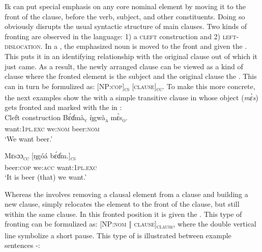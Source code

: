 Ik can put special emphasis on any core nominal element by moving it to the front of the clause, before the verb, subject, and other constituents. Doing so obviously disrupts the usual syntactic structure of main clauses. Two kinds of fronting are observed in the language: 1) a \textsc{cleft} construction and 2) \textsc{left-dislocation}. In a , the emphasized noun is moved to the front and given the . This puts it in an identifying relationship with the original clause out of which it just came. As a result, the newly arranged clause can be viewed as a kind of  clause where the fronted element is the  subject and the original clause the  . This can in turn be formulized as: [NP:\textsc{cop}]\textsc{\textsubscript{cs}}\textsc{ [clause]}\textsc{\textsubscript{cc}}. To make this more concrete, the next examples show the  with a simple transitive clause in  whose object (\textit{m\`{ɛ}s}) gets fronted and marked with the  in :\\ 




Cleft construction
\ea\label{ex:syn:31}
\gll B\'{ɛ}ɗ{\Í}mà\textsc{\textsubscript{v}}    {\`{ŋ}gwà}\textsc{\textsubscript{a}}    m\`{ɛ}s\textsc{\textsubscript{o}}. \\
want:\textsc{1pl.exc}   we:\textsc{nom}  beer:\textsc{nom}    \\
\glt ‘We want beer.’ 
\z




\ea\label{ex:syn:32}
\gll Mɛsɔɔ\textsc{\textsubscript{cc}}     [ŋgóá    b\'{ɛ}ɗ{\Í}m.]\textsc{\textsubscript{cs}} \\
beer:\textsc{cop}    we:\textsc{acc}   want:\textsc{1pl.exc}    \\   
\glt ‘It is beer (that) we want.’ 
\z


Whereas the  involves removing a clausal element from a clause and building a new clause,  simply relocates the element to the front of the clause, but still within the same clause. In this fronted position it is given the . This type of fronting can be formulized as: [NP:\textsc{nom} \textsc{‖}\textsc{ clause]}\textsc{\textsubscript{clause}}, where the double vertical line symbolize a short pause. This type of  is illustrated between example sentences -:\\




